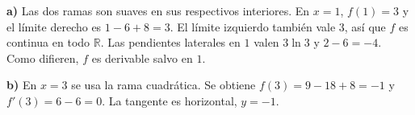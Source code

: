 \textbf{a)} Las dos ramas son suaves en sus respectivos interiores. En $x=1$, $f(1)=3$ y el límite derecho es $1-6+8=3$. El límite izquierdo también vale $3$, así que $f$ es continua en todo $\mathbb R$. Las pendientes laterales en $1$ valen $3\ln3$ y $2-6=-4$. Como difieren, $f$ es derivable salvo en $1$.

\textbf{b)} En $x=3$ se usa la rama cuadrática. Se obtiene $f(3)=9-18+8=-1$ y $f'(3)=6-6=0$. La tangente es horizontal, $\boxed{y=-1}$.
